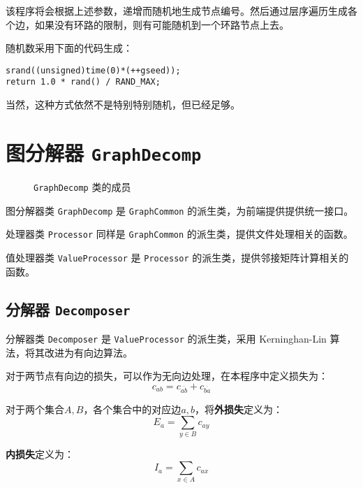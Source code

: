 \documentclass[a4paper,12pt]{article}
\begin{document}
\begin{CJK}{UTF8}{song}
该程序将会根据上述参数，递增而随机地生成节点编号。然后通过层序遍历生成各个边，如果没有环路的限制，则有可能随机到一个环路节点上去。

随机数采用下面的代码生成：

\begin{lstlisting}
srand((unsigned)time(0)*(++gseed));
return 1.0 * rand() / RAND_MAX;	
\end{lstlisting}

当然，这种方式依然不是特别特别随机，但已经足够。

\section{图分解器 \texttt{GraphDecomp}}

\begin{figure}[H]
    \centering
    
    \caption{\texttt{GraphDecomp} 类的成员}
\end{figure}

图分解器类 \texttt{GraphDecomp} 是 \texttt{GraphCommon}
的派生类，为前端提供提供统一接口。

处理器类 \texttt{Processor} 同样是 \texttt{GraphCommon}
的派生类，提供文件处理相关的函数。

值处理器类 \texttt{ValueProcessor} 是 \texttt{Processor}
的派生类，提供邻接矩阵计算相关的函数。

\hypertarget{header-n135}{%
\subsection{\texorpdfstring{分解器
\texttt{Decomposer}}{分解器 Decomposer}}\label{header-n135}}

分解器类 \texttt{Decomposer} 是 \texttt{ValueProcessor} 的派生类，采用
Kerninghan-Lin
算法\cite{kl}，将其改进为有向边算法。

对于两节点有向边的损失，可以作为无向边处理，在本程序中定义损失为：
\begin{equation}
    c_{ab} = c_{\overline{ab}}+c_{\overline{ba}}
\end{equation}

对于两个集合$A,B$，各个集合中的对应边$a,b$，将\textbf{外损失}定义为：\begin{equation}
    E_a=\sum_{y \in B}c_{ay}
\end{equation}

\textbf{内损失}定义为：
\begin{equation}
    I_a=\sum_{x \in A}c_{ax}
\end{equation}


\end{CJK}
\end{document}

